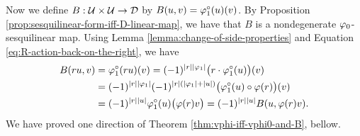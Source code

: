 \documentclass{amsbook}
\begin{document}
%





Now we define $B: \mathcal U\times \mathcal U \to \mathcal{D}$ by $B(u, v) = \varphi_1^\circ (u)(v)$. 
By Proposition \ref{prop:sesquilinear-form-iff-D-linear-map}, we have that $B$ is a nondegenerate $\varphi_0$-sesquilinear map. 
Using Lemma \ref{lemma:change-of-side-properties} and Equation \eqref{eq:R-action-back-on-the-right}, we have
%
\begin{equation*}
    \begin{split}
        B(ru,v) &= \varphi_1^\circ (ru)(v) = (-1)^{|r||\varphi_1|} \big(r \cdot \varphi_1^\circ (u) \big) (v)\\ &= (-1)^{|r||\varphi_1|} (-1)^{|r|(|\varphi_1| + |u|)} \big(\varphi_1^\circ (u) \circ \varphi(r) \big)(v) \\ &= (-1)^{|r||u|} \varphi_1^\circ (u) \big( \varphi(r)v \big)= (-1)^{|r||u|} B(u,\varphi(r)v).
    \end{split}
\end{equation*}
We have proved one direction of Theorem \ref{thm:vphi-iff-vphi0-and-B}, bellow. 
\end{document}
